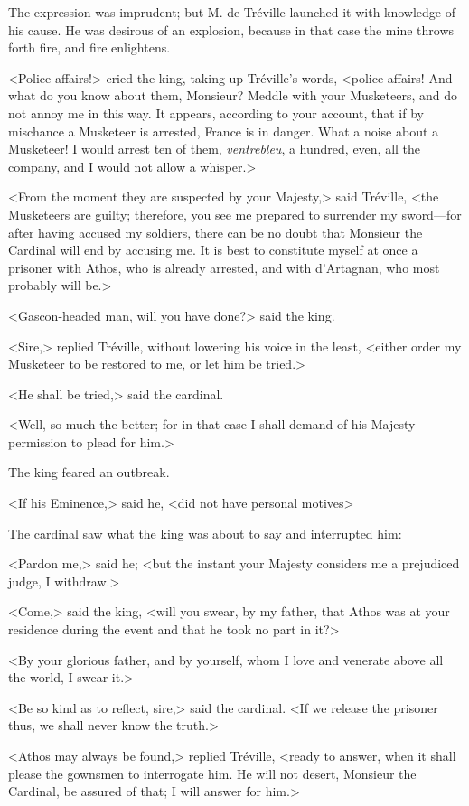 The expression was imprudent; but M. de Tréville launched it with knowledge of his cause. He was desirous of an explosion, because in that case the mine throws forth fire, and fire enlightens. 

<Police affairs!> cried the king, taking up Tréville's words, <police affairs! And what do you know about them, Monsieur? Meddle with your Musketeers, and do not annoy me in this way. It appears, according to your account, that if by mischance a Musketeer is arrested, France is in danger. What a noise about a Musketeer! I would arrest ten of them, \textit{ventrebleu}, a hundred, even, all the company, and I would not allow a whisper.> 

<From the moment they are suspected by your Majesty,> said Tréville, <the Musketeers are guilty; therefore, you see me prepared to surrender my sword---for after having accused my soldiers, there can be no doubt that Monsieur the Cardinal will end by accusing me. It is best to constitute myself at once a prisoner with Athos, who is already arrested, and with d'Artagnan, who most probably will be.> 

<Gascon-headed man, will you have done?> said the king. 

<Sire,> replied Tréville, without lowering his voice in the least, <either order my Musketeer to be restored to me, or let him be tried.> 

<He shall be tried,> said the cardinal. 

<Well, so much the better; for in that case I shall demand of his Majesty permission to plead for him.> 

The king feared an outbreak. 

<If his Eminence,> said he, <did not have personal motives\longdash> 

The cardinal saw what the king was about to say and interrupted him: 

<Pardon me,> said he; <but the instant your Majesty considers me a prejudiced judge, I withdraw.> 

<Come,> said the king, <will you swear, by my father, that Athos was at your residence during the event and that he took no part in it?> 

<By your glorious father, and by yourself, whom I love and venerate above all the world, I swear it.> 

<Be so kind as to reflect, sire,> said the cardinal. <If we release the prisoner thus, we shall never know the truth.> 

<Athos may always be found,> replied Tréville, <ready to answer, when it shall please the gownsmen to interrogate him. He will not desert, Monsieur the Cardinal, be assured of that; I will answer for him.> 

